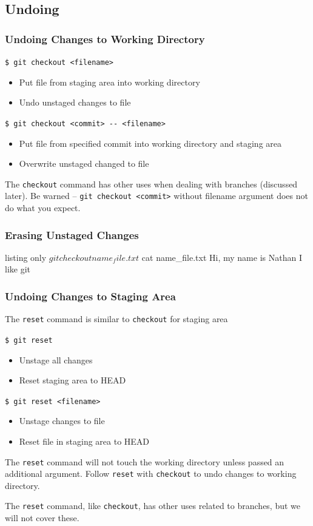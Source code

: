 \documentclass[english,compress]{beamer}
\begin{document}
\subsection{Undoing}
\begin{frame}[fragile]
    \frametitle{Undoing Changes to Working Directory}

    \verb|$ git checkout <filename>|
    \begin{itemize}
        \item Put file from staging area into working directory
        \item Undo unstaged changes to file
    \end{itemize}
    \verb|$ git checkout <commit> -- <filename>|
    \begin{itemize}
        \item Put file from specified commit into working directory and
              staging area
        \item Overwrite unstaged changed to file
    \end{itemize}

    The \verb|checkout| command has other uses when dealing with branches
    (discussed later). Be warned -- \verb|git checkout <commit>| without
    filename argument does not do what you expect.
\end{frame}

\begin{frame}[fragile]
    \frametitle{Erasing Unstaged Changes}
    \begin{tcblisting}{listing only}
$ git checkout name_file.txt
$ cat name_file.txt
Hi, my name is Nathan
I like git
    \end{tcblisting}
\end{frame}

\begin{frame}[fragile]
    \frametitle{Undoing Changes to Staging Area}

    The \verb|reset| command is similar to \verb|checkout| for staging area

    \verb|$ git reset|
    \begin{itemize}
        \item Unstage all changes
        \item Reset staging area to HEAD
    \end{itemize}
    \verb|$ git reset <filename>|
    \begin{itemize}
        \item Unstage changes to file
        \item Reset file in staging area to HEAD
    \end{itemize}

    The \verb|reset| command will not touch the working directory unless
    passed an additional argument. Follow \verb|reset| with \verb|checkout|
    to undo changes to working directory.

    The \verb|reset| command, like \verb|checkout|, has other uses related
    to branches, but we will not cover these.
\end{frame}
\end{document}
